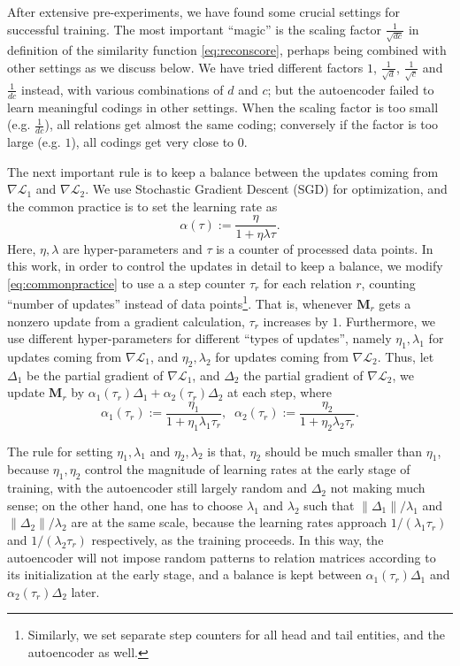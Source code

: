 \documentclass[11pt,a4paper]{article}
\newcommand{\mat}[1]{\bm{#1}}
\begin{document}
After extensive pre-experiments, we have found some crucial settings for successful 
training. The most important ``magic'' is the scaling factor $\frac{1}{\sqrt{dc}}$ 
in definition of the similarity function \eqref{eq:reconscore}, perhaps being 
combined with other settings as we discuss below. We have tried different 
factors $1$, $\frac{1}{\sqrt{d}}$, $\frac{1}{\sqrt{c}}$ and 
$\frac{1}{dc}$ instead, with various combinations of $d$ and $c$; but 
the autoencoder failed to learn meaningful codings in other settings. 
When the scaling factor is too small 
(e.g. $\frac{1}{dc}$), all relations get almost the same coding; conversely if 
the factor is too large (e.g. $1$), all codings get very close to $0$. 

The next important rule is to keep a balance between the updates coming from 
$\nabla\mathcal{L}_1$ and $\nabla\mathcal{L}_2$. We 
use Stochastic Gradient 
Descent (SGD) for optimization, and the common practice \citep{bottou2012stochastic} is to set the 
learning rate as
\begin{equation}\label{eq:commonpractice}
\alpha(\tau):=\frac{\eta}{1+\eta\lambda\tau}. 
\end{equation}
Here, $\eta,\lambda$ are hyper-parameters and $\tau$ is a counter of 
processed data points. In this work, in order to control 
the updates in detail to keep a balance, we modify \eqref{eq:commonpractice} to use a 
a step 
counter $\tau_r$ for each relation $r$, counting ``number of updates'' 
instead of 
data points\footnote{Similarly, we set separate step counters for all head 
and tail entities, and the autoencoder as well.}. That is, whenever $\mat{M}_r$ gets a 
nonzero update from a gradient calculation, $\tau_r$ increases by $1$. 
Furthermore, we use different hyper-parameters for different ``types of updates'', 
namely $\eta_1,\lambda_1$ for updates coming from $\nabla\mathcal{L}_1$, and 
$\eta_2,\lambda_2$ for updates coming from $\nabla\mathcal{L}_2$. 
Thus, let $\Delta_1$ be the partial gradient of $\nabla\mathcal{L}_1$, and $\Delta_2$ the partial gradient of $\nabla\mathcal{L}_2$, we 
update $\mat{M}_r$ by $\alpha_1(\tau_r)\Delta_1+\alpha_2(\tau_r)\Delta_2$ at 
each step, where 
$$
\alpha_1(\tau_r):=\frac{\eta_1}{1+\eta_1\lambda_1\tau_r},\;\;
\alpha_2(\tau_r):=\frac{\eta_2}{1+\eta_2\lambda_2\tau_r}.
$$

The rule for setting $\eta_1,\lambda_1$ and $\eta_2,\lambda_2$ 
is that, $\eta_2$ should be much smaller than $\eta_1$, because 
$\eta_1,\eta_2$ control the magnitude of learning rates at the early stage of 
training, with the autoencoder still largely random and $\Delta_2$ not 
making much sense; on the other hand, one has to choose $\lambda_1$ and 
$\lambda_2$ such that 
$\lVert\Delta_1\rVert/\lambda_1$ and $\lVert\Delta_2\rVert/\lambda_2$ are at 
the same scale, because the learning rates approach $1/(\lambda_1\tau_r)$ 
and $1/(\lambda_2\tau_r)$ respectively, as the training proceeds. 
In this way, the autoencoder will not impose random patterns to relation matrices 
according to its initialization at the early stage, and a balance 
is kept between $\alpha_1(\tau_r)\Delta_1$ and $\alpha_2(\tau_r)\Delta_2$ later.
\end{document}
